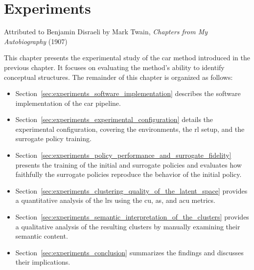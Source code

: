 \chapter{Experiments}
\label{chap:experiments}

{Attributed to Benjamin Disraeli by Mark Twain, \textit{Chapters from My Autobiography} (1907)~\parencite{twain1907chapters}}

\chaptercontents

\glsresetall

This chapter presents the experimental study of the \gls{car} method introduced in the previous chapter.
It focuses on evaluating the method's ability to identify conceptual structures.
The remainder of this chapter is organized as follows:
\begin{itemize}
    \item Section~\ref{sec:experiments_software_implementation} describes the software implementation of the \gls{car} pipeline.
    \item Section~\ref{sec:experiments_experimental_configuration} details the experimental configuration, covering the environments, the \gls{rl} setup, and the surrogate policy training.
    \item Section~\ref{sec:experiments_policy_performance_and_surrogate_fidelity} presents the training of the initial and surrogate policies and evaluates how faithfully the surrogate policies reproduce the behavior of the initial policy.
    \item Section~\ref{sec:experiments_clustering_quality_of_the_latent_space} provides a quantitative analysis of the \glspl{lr} using the \gls{cu}, \gls{as}, and \gls{acu} metrics.
    \item Section~\ref{sec:experiments_semantic_interpretation_of_the_clusters} provides a qualitative analysis of the resulting clusters by manually examining their semantic content.
    \item Section~\ref{sec:experiments_conclusion} summarizes the findings and discusses their implications.
\end{itemize}






\DisableCompactFloats


